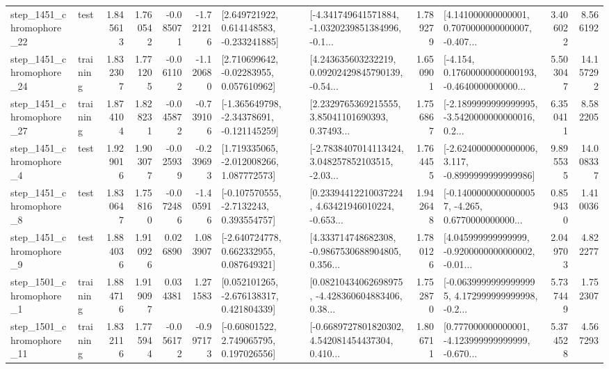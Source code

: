 \begin{tabular}{llrrrrllrlrr}
 step\_1451\_chromophore\_22 &      test &      1.845613 &    1.760542 &     -0.085071 & -1.721216 &    [2.649721922, 0.614148583, -0.233241885] &  [-4.341749641571884, -1.0320239851384996, -0.1... &       1.789279 &  [4.141000000000001, 0.7070000000000007, -0.407... &            3.406022 &          8.566192 \\
 step\_1451\_chromophore\_24 &  training &      1.832307 &    1.771205 &     -0.061102 & -1.120680 &     [2.710699642, -0.02283955, 0.057610962] &  [4.243635603232219, 0.09202429845790139, -0.54... &       1.650901 &  [-4.154, 0.17600000000000193, -0.4640000000000... &            5.503047 &         14.157292 \\
 step\_1451\_chromophore\_27 &  training &      1.874104 &    1.828231 &     -0.045872 & -0.739106 &   [-1.365649798, -2.34378691, -0.121145259] &  [2.2329765369215555, 3.85041101690393, 0.37493... &       1.756867 &  [-2.1899999999999995, -3.5420000000000016, 0.2... &            6.350411 &          8.582205 \\
  step\_1451\_chromophore\_4 &      test &      1.929016 &    1.903077 &     -0.025939 & -0.239693 &    [1.719335065, -2.012008266, 1.087772573] &  [-2.7838407014113424, 3.048257852103515, -2.03... &       1.764455 &  [-2.6240000000000006, 3.117, -0.8999999999999986] &            9.895535 &         14.008337 \\
  step\_1451\_chromophore\_8 &      test &      1.830647 &    1.758160 &     -0.072486 & -1.405916 &     [-0.107570555, -2.7132243, 0.393554757] &  [0.23394412210037224, 4.63421946010224, -0.653... &       1.942648 &  [-0.14000000000000057, -4.265, 0.6770000000000... &            0.859430 &          1.410036 \\
  step\_1451\_chromophore\_9 &      test &      1.884036 &    1.910926 &      0.026890 &  1.083907 &    [-2.640724778, 0.662332955, 0.087649321] &  [4.333714748682308, -0.9867530688904805, 0.356... &       1.780126 &  [4.045999999999999, -0.9200000000000002, -0.01... &            2.049703 &          4.822277 \\
  step\_1501\_chromophore\_1 &  training &      1.884716 &    1.919097 &      0.034381 &  1.271583 &    [0.052101265, -2.676138317, 0.421804339] &  [0.08210434062698975, -4.428360604883406, 0.38... &       1.752870 &  [-0.06399999999999995, 4.172999999999998, -0.2... &            5.737449 &          1.752307 \\
 step\_1501\_chromophore\_11 &  training &      1.832116 &    1.775944 &     -0.056172 & -0.997173 &     [-0.60801522, 2.749065795, 0.197026556] &  [-0.6689727801820302, 4.542081454437304, 0.410... &       1.806711 &  [0.777000000000001, -4.123999999999999, -0.670... &            5.374528 &          4.567293 \\

\end{tabular}
